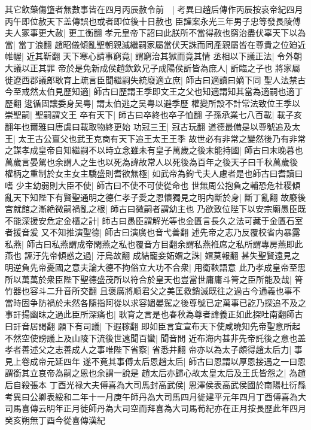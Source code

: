 其它飲藥傷墯者無數事皆在四月丙辰赦令前　|{
	考異曰趙后傳作丙辰按哀帝紀四月丙午即位赦天下盖傳誤也或者即位後十日赦也}
臣謹案永光三年男子忠等發長陵傅夫人冢事更大赦|{
	更工衡翻}
孝元皇帝下詔曰此朕所不當得赦也窮治盡伏辜天下以為當|{
	當丁浪翻}
趙昭儀傾亂聖朝親滅繼嗣家屬當伏天誅而同產親屬皆在尊貴之位廹近帷幄|{
	近其靳翻}
天下寒心請事窮竟|{
	謂窮治其獄而竟其情}
丞相以下議正法|{
	令外朝大議以正其罪}
帝於是免新成侯趙欽欽兄子成陽侯訢皆為庶人|{
	訢臨之子也}
將家屬徙遼西郡議郎耿育上疏言臣聞繼嗣失統廢適立庶|{
	師古曰適讀曰嫡下同}
聖人法禁古今至戒然太伯見歷知適|{
	師古曰歷謂王季即文王之父也知適謂知其當為適嗣也適丁歷翻}
逡循固讓委身吴粤|{
	謂太伯逃之吴粤以避季歷}
權變所設不計常法致位王季以崇聖嗣|{
	聖嗣謂文王}
卒有天下|{
	師古曰卒終也卒子恤翻}
子孫承業七八百載|{
	載子亥翻年也爾雅曰唐虞曰載取物終更始}
功冠三王|{
	冠古玩翻}
道德最備是以尊號追及太王|{
	太王古公亶父也武王克商有天下追王太王王季}
故世必有非常之變然後乃有非常之謀孝成皇帝自知繼嗣不以時立念雖未有皇子萬歲之後末能持國|{
	師古曰末晚暮也萬歲言晏駕也余謂人之生也以死為諱故常人以死後為百年之後天子曰千秋萬歲後}
權柄之重制於女主女主驕盛則耆欲無極|{
	如武帝為鉤弋夫人慮者是也師古曰耆讀曰嗜}
少主幼弱則大臣不使|{
	師古曰不使不可使從命也}
世無周公抱負之輔恐危社稷傾亂天下知陛下有賢聖通明之德仁孝子愛之恩懷獨見之明内斷於身|{
	斷丁亂翻}
故廢後宫就館之漸絶微嗣禍亂之根|{
	師古曰微嗣者謂幼主也}
乃欲致位陛下以安宗廟愚臣既不能深援安危定金櫃之計|{
	師古曰愚臣謂解光等也金匱言長久之法可藏于金匱石室者援音爰}
又不知推演聖德|{
	師古曰演廣也音弋善翻}
述先帝之志乃反覆校省内暴露私燕|{
	師古曰私燕謂成帝閑燕之私也覆音方目翻余謂私燕袵席之私所謂專房燕即此燕也}
誣汙先帝傾惑之過|{
	汙烏故翻}
成結寵妾妬媢之誅|{
	媢莫報翻}
甚失聖賢遠見之明逆負先帝憂國之意夫論大德不拘俗立大功不合衆|{
	用衛鞅語意}
此乃孝成皇帝至思所以萬萬於衆臣陛下聖德盛茂所以符合於皇天也豈當世庸庸斗筲之臣所能及哉|{
	筲竹器也容斗二升音所交翻}
且褒廣將順君父之美匡救銷滅既往之過古今通義也事不當時固争防禍於未然各隨指阿從以求容媚晏駕之後尊號已定萬事已訖乃探追不及之事訐揚幽昩之過此臣所深痛也|{
	耿育之言是也春秋為尊者諱義正如此探吐南翻師古曰訐音居謁翻}
願下有司議|{
	下遐稼翻}
即如臣言宜宣布天下使咸曉知先帝聖意所起不然空使謗議上及山陵下流後世遠聞百蠻|{
	聞音問}
近布海内甚非先帝託後之意也盖孝者善述父之志善成人之事唯陛下省察|{
	省悉井翻}
帝亦以為太子頗得趙太后力|{
	事見上卷成帝元延四年}
遂不竟其事傅太后恩趙太后|{
	師古曰恩謂以厚恩接遇之一曰恩謂銜其立哀帝為嗣之恩也余謂一說是}
趙太后亦歸心故太皇太后及王氏皆怨之|{
	為趙后自殺張本}
丁酉光禄大夫傅喜為大司馬封高武侯|{
	恩澤侯表高武侯國於南陽杜衍縣考異曰公卿表綏和二年十一月庚午師丹為大司馬四月徙建平元年四月丁酉傅喜為大司馬喜傳云明年正月徙師丹為大司空而拜喜為大司馬荀紀亦在正月按長歷此年四月癸亥朔無丁酉今從喜傳漢紀}
